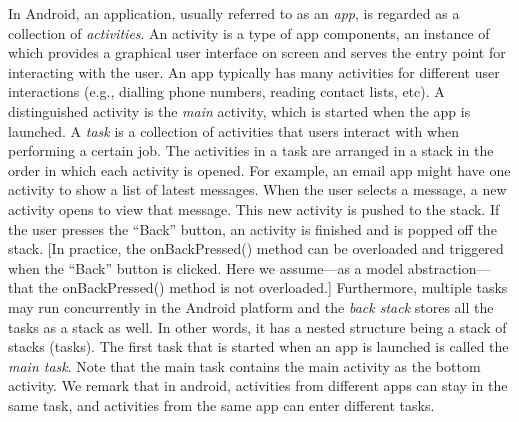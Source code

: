 
In Android, an application, usually referred to as an \emph{app}, is regarded as a collection of \emph{activities}. An activity is a type of app components, an instance of which provides a graphical user interface on screen and  serves the entry point for interacting with the user\cite{Androiddoc}. An app typically has many activities for different user interactions (e.g., dialling phone numbers, reading contact lists, etc). A distinguished activity is the \emph{main} activity, which is started when the app is launched.
%
A \emph{task} is a collection of activities that users interact with when performing a certain job.
The activities in a task are arranged in a stack %
in the order in which each activity is opened. For example, an email app might have one activity to show a list of latest messages. When the user selects a message, a new activity opens to view that message. This new activity is pushed to the stack. If the user presses the ``Back'' button, an activity is finished and is popped off the stack. [In practice, the onBackPressed() method can be overloaded and triggered when the ``Back'' button is clicked. Here we assume---as a model abstraction---that the onBackPressed() method is not overloaded.]
Furthermore, multiple tasks may run concurrently in the Android platform and the \emph{back stack} stores all the tasks as a stack as well. In other words, it has a nested structure being a stack of stacks (tasks). The first task that is started when an app is launched is called the \emph{main task}. Note that the main task contains the main activity as the bottom activity. 
%
We remark that %
in android, activities from different apps can stay in the same task, and activities from the same app can enter different tasks.

